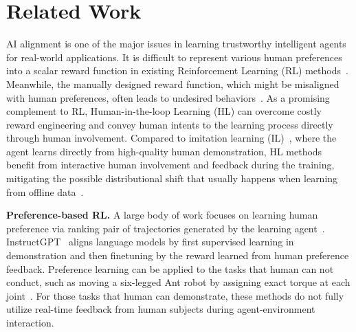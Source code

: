 \section{Related Work}
AI alignment is one of the major issues in learning trustworthy intelligent agents for real-world applications. It is difficult to represent various human preferences into a scalar reward function in existing Reinforcement Learning (RL) methods~\citep{russell2019human,dafoe2020open}. Meanwhile, the manually designed reward function, which might be misaligned with human preferences, often leads to undesired behaviors~\citep{leike2018scalable,krakovna2020specification}.
As a promising complement to RL, Human-in-the-loop Learning (HL) can overcome costly reward engineering and convey human intents to the learning process directly through human involvement.
Compared to imitation learning (IL)~\citep{ho2016generative,fu2018learning}, where the agent learns directly from high-quality human demonstration, HL methods benefit from interactive human involvement and feedback during the training, mitigating the possible distributional shift that usually happens when learning from offline data~\citep{ross2010efficient}.


\textbf{Preference-based RL.}
A large body of work focuses on learning human preference via ranking pair of trajectories generated by the learning agent~\citep{christiano2017deep,guan2021widening,reddy2018shared, warnell2018deep, sadigh2017active, palan2019learning,lee2021pebble,wang2021apple}.
InstructGPT~\citep{ouyang2022training} aligns language models by first supervised learning in demonstration and then finetuning by the reward learned from human preference feedback.
Preference learning can be applied to the tasks that human can not conduct, such as moving a six-legged Ant robot by assigning exact torque at each joint~\citep{christiano2017deep}.
For those tasks that human can demonstrate, these methods do not fully utilize real-time feedback from human subjects during agent-environment interaction.


